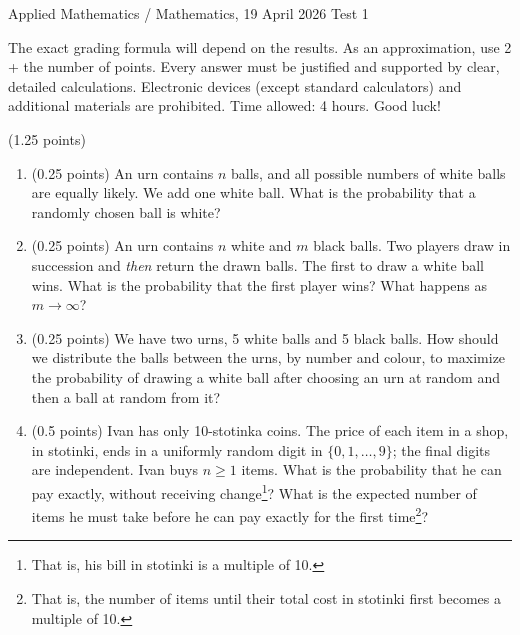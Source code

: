 \documentclass[a4paper]{report}
\begin{document}
\noindent Applied Mathematics / Mathematics, 19 April 2026 \hfill Test 1
\hrulefill
\begin{it}
The exact grading formula will depend on the results. As an approximation, use 2 + the number of points. Every answer must be justified and supported by clear, detailed calculations. Electronic devices (except standard calculators) and additional materials are prohibited. Time allowed: 4 hours. Good luck!
\end{it}
\begin{problem} (1.25 points)~
\begin{enumerate}
\item (0.25 points) An urn contains $n$ balls, and all possible numbers of white balls are equally likely. We add one white ball. What is the probability that a randomly chosen ball is white?
\item (0.25 points) An urn contains $n$ white and $m$ black balls. Two players draw in succession and \emph{then} return the drawn balls. The first to draw a white ball wins. What is the probability that the first player wins? What happens as $m\to\infty$?
\item (0.25 points) We have two urns, 5 white balls and 5 black balls. How should we distribute the balls between the urns, by number and colour, to maximize the probability of drawing a white ball after choosing an urn at random and then a ball at random from it?
\item (0.5 points) Ivan has only 10-stotinka coins. The price of each item in a shop, in stotinki, ends in a uniformly random digit in $\{0,1,\ldots,9\}$; the final digits are independent. Ivan buys $n\geq1$ items. What is the probability that he can pay exactly, without receiving change\footnote{That is, his bill in stotinki is a multiple of 10.}? What is the expected number of items he must take before he can pay exactly for the first time\footnote{That is, the number of items until their total cost in stotinki first becomes a multiple of 10.}?
\end{enumerate}
\end{problem}
\end{document}
